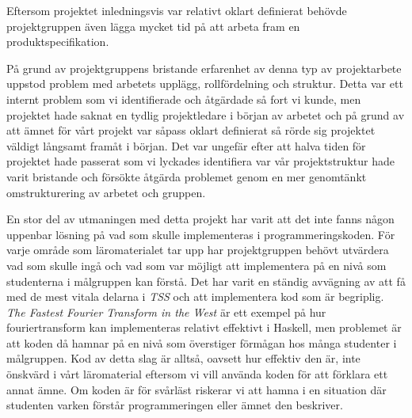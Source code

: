 \documentclass[]{article}
\begin{document}
Eftersom projektet inledningsvis var relativt oklart definierat behövde projektgruppen även lägga mycket tid på att
arbeta fram en produktspecifikation.

På grund av projektgruppens bristande erfarenhet av denna typ av projektarbete uppstod problem med arbetets upplägg,
rollfördelning och struktur. Detta var ett internt problem som vi identifierade och åtgärdade så fort vi kunde, men
projektet hade saknat en tydlig projektledare i början av arbetet och på grund av att ämnet för vårt projekt var såpass
oklart definierat så rörde sig projektet väldigt långsamt framåt i början. Det var ungefär efter att halva tiden för
projektet hade passerat som vi lyckades identifiera var vår projektstruktur hade varit bristande och försökte åtgärda
problemet genom en mer genomtänkt omstrukturering av arbetet och gruppen.

En stor del av utmaningen med detta projekt har varit att det inte fanns någon uppenbar lösning på vad som skulle
implementeras i programmeringskoden. För varje område som läromaterialet tar upp har projektgruppen behövt utvärdera
vad som skulle ingå och vad som var möjligt att implementera på en nivå som studenterna i målgruppen kan förstå. Det
har varit en ständig avvägning av att få med de mest vitala delarna i \textit{TSS} och att implementera kod som är
begriplig.  \textit{The Fastest Fourier Transform in the West} %
är ett exempel på hur fouriertransform kan implementeras relativt effektivt i Haskell, men problemet är att koden då
hamnar på en nivå som överstiger förmågan hos många studenter i målgruppen. Kod av detta slag är alltså, oavsett hur
effektiv den är, inte önskvärd i vårt läromaterial eftersom vi vill använda koden för att förklara ett annat ämne. Om
koden är för svårläst riskerar vi att hamna i en situation där studenten varken förstår programmeringen eller ämnet den
beskriver.
\end{document}
